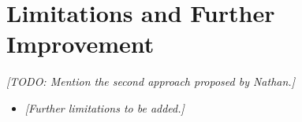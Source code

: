 \section{Limitations and Further Improvement}

\textit{[TODO: Mention the second approach proposed by Nathan.]}

\begin{itemize}
    \item \textit{[Further limitations to be added.]}
\end{itemize}
